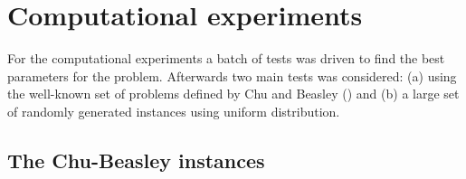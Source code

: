 \documentclass[10pt,conference, compsocconf]{IEEEtran}
\begin{document}


\section{Computational experiments}
\label{sec:exp}

For the computational experiments a batch of tests was driven to find the best
parameters for the problem.
Afterwards two main tests was considered:
(a) using the well-known set of problems defined by Chu and Beasley (\cite{Chu-Beasley-1998})
and (b) a large set of randomly generated instances using uniform distribution.

\subsection{The Chu-Beasley instances}
\end{document}
